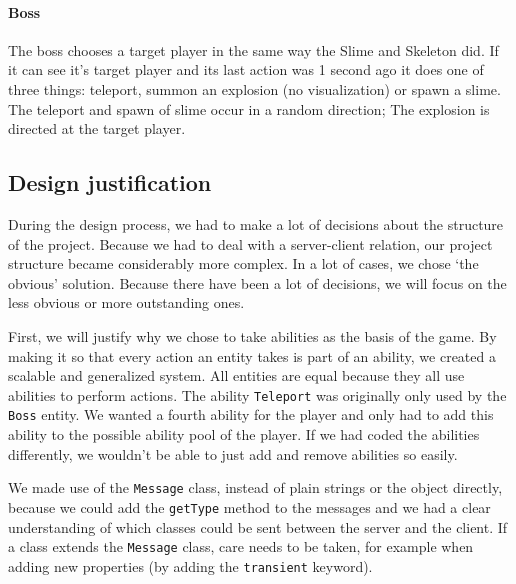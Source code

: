 \documentclass[../main.tex]{subfiles}
\begin{document}
		\paragraph{Boss}
		The boss chooses a target player in the same way the Slime and Skeleton did. If it can see it's target player and its last action was 1 second ago it does one of three things: teleport, summon an explosion (no visualization) or spawn a slime. The teleport and spawn of slime occur in a random direction; The explosion is directed at the target player.
	\pagebreak 
	\subsection{Design justification}
	During the design process, we had to make a lot of decisions about the structure of the project. Because we had to deal with a server-client relation, our project structure became considerably more complex. In a lot of cases, we chose `the obvious' solution. Because there have been a lot of decisions, we will focus on the less obvious or more outstanding ones.
	
	First, we will justify why we chose to take abilities as the basis of the game. By making it so that every action an entity takes is part of an ability, we created a scalable and generalized system. All entities are equal because they all use abilities to perform actions. The ability \texttt{Teleport} was originally only used by the \texttt{Boss} entity. We wanted a fourth ability for the player and only had to add this ability to the possible ability pool of the player. If we had coded the abilities differently, we wouldn't be able to just add and remove abilities so easily.
	
	We made use of the \texttt{Message} class, instead of plain strings or the object directly, because we could add the \texttt{getType} method to the messages and we had a clear understanding of which classes could be sent between the server and the client. If a class extends the \texttt{Message} class, care needs to be taken, for example when adding new properties (by adding the \texttt{transient} keyword).
	
\end{document}
